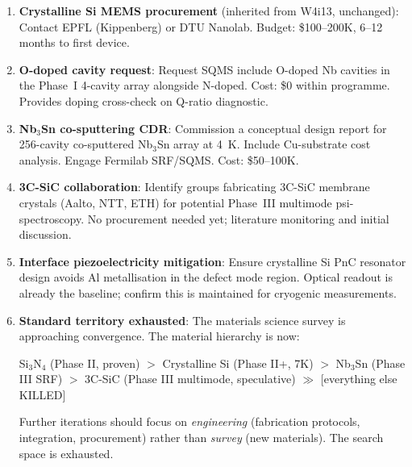 \documentclass[11pt]{article}
\theoremstyle{definition}
\theoremstyle{remark}
\begin{document}
\begin{enumerate}[nosep]
\item \textbf{Crystalline Si MEMS procurement} (inherited from W4i13,
  unchanged): Contact EPFL (Kippenberg) or DTU Nanolab. Budget:
  \$100--200K, 6--12 months to first device.

\item \textbf{O-doped cavity request}: Request SQMS include O-doped
  Nb cavities in the Phase~I 4-cavity array alongside N-doped.
  Cost: \$0 within programme. Provides doping cross-check on Q-ratio
  diagnostic.

\item \textbf{Nb$_3$Sn co-sputtering CDR}: Commission a conceptual
  design report for 256-cavity co-sputtered Nb$_3$Sn array at 4~K.
  Include Cu-substrate cost analysis. Engage Fermilab SRF/SQMS.
  Cost: \$50--100K.

\item \textbf{3C-SiC collaboration}: Identify groups fabricating
  3C-SiC membrane crystals (Aalto, NTT, ETH) for potential Phase~III
  multimode psi-spectroscopy. No procurement needed yet; literature
  monitoring and initial discussion.

\item \textbf{Interface piezoelectricity mitigation}: Ensure
  crystalline Si PnC resonator design avoids Al metallisation in
  the defect mode region. Optical readout is already the baseline;
  confirm this is maintained for cryogenic measurements.

\item \textbf{Standard territory exhausted}: The materials science
  survey is approaching convergence. The material hierarchy is now:
  \begin{center}
  Si$_3$N$_4$ (Phase II, proven) $>$ Crystalline Si (Phase II+, 7K)
  $>$ Nb$_3$Sn (Phase III SRF) $>$ 3C-SiC (Phase III multimode,
  speculative) $\gg$ [everything else KILLED]
  \end{center}
  Further iterations should focus on \textit{engineering} (fabrication
  protocols, integration, procurement) rather than \textit{survey}
  (new materials). The search space is exhausted.
\end{enumerate}
\end{document}
